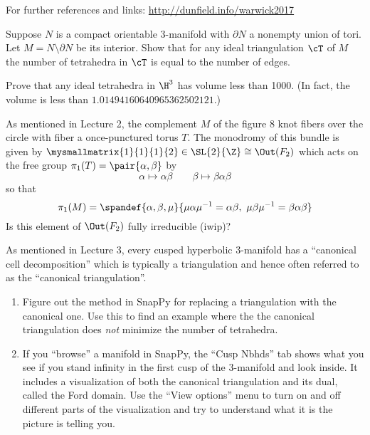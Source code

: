 \documentclass[tikz, a4paper]{nmd/hw}
\begin{document}

For further references and links: \url{http://dunfield.info/warwick2017}


\begin{problems}
\item Suppose $N$ is a compact orientable 3-manifold with $\partial N$
  a nonempty union of tori.  Let $M = N \setminus \partial N$ be its
  interior.  Show that for any ideal triangulation $\cT$ of $M$ the
  number of tetrahedra in $\cT$ is equal to the number of edges.

\item Prove that any ideal tetrahedra in $\H^3$ has volume less than
  1000. (In fact, the volume is less than
  $1.01494160640965362502121$.)

\item As mentioned in Lecture 2, the complement $M$ of the figure 8
  knot fibers over the circle with fiber a once-punctured torus $T$.
  The monodromy of this bundle is given by $\mysmallmatrix{1}{1}{1}{2}
  \in \SL{2}{\Z} \cong \Out(F_2)$ which acts on the free group
  $\pi_1(T) = \pair{\alpha, \beta}$ by
  \[
    \alpha \mapsto \alpha \beta \qquad \beta \mapsto \beta \alpha \beta
  \]
  so that
  \[
    \pi_1(M) = \spandef{\alpha, \beta, \mu}{\mu \alpha \mu^{-1} =
      \alpha \beta, \ \mu \beta \mu^{-1} =  \beta \alpha \beta}
  \]
  Is this element of $\Out(F_2)$ fully irreducible (iwip)?

  \item As mentioned in Lecture 3, every cusped hyperbolic 3-manifold
    has a ``canonical cell decomposition'' which is typically a
    triangulation and hence often referred to as the ``canonical
    triangulation''.
    \begin{enumerate}
      \item Figure out the method in SnapPy for replacing a
        triangulation with the canonical one.  Use this to find an
        example where the the canonical triangulation does \emph{not}
        minimize the number of tetrahedra.

      \item If you ``browse'' a manifold in SnapPy, the ``Cusp Nbhds''
        tab shows what you see if you stand infinity in the first
        cusp of the 3-manifold and look inside.  It includes a
        visualization of both the canonical triangulation and its
        dual, called the Ford domain.  Use the ``View options'' menu
        to turn on and off different parts of the visualization and
        try to understand what it is the picture is telling you.
    \end{enumerate}
  

\end{problems}
\end{document}
